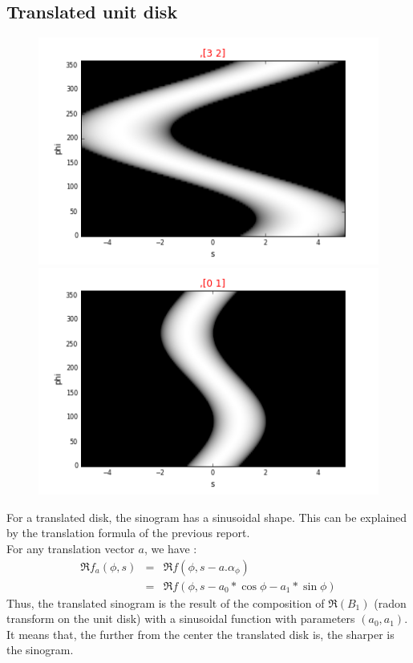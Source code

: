 \documentclass[a4,12pt]{article}
\begin{document}
\subsection{Translated unit disk}
\begin{figure}[h!]
   \begin{minipage}[c]{.46\linewidth}
      \includegraphics[scale=0.5]{../images/sinograms/translatedUnitDisk.png} 
   \end{minipage} \hfill
   \begin{minipage}[c]{.46\linewidth}
      \includegraphics[scale=0.5]{../images/sinograms/translatedUnitDiskCloseCenter1.png} 
   \end{minipage}
\end{figure}
For a translated disk, the sinogram has a sinusoidal shape. This can be explained by the translation formula of the previous report. \\
For any translation vector $a$, we have :
\begin{eqnarray*}
\Re f_{a}(\phi,s) &=& \Re f(\phi,s-a.\alpha_{\phi}) \\
                 &=& \Re f(\phi,s-a_{0}*\cos\phi - a_{1}*\sin\phi)
\end{eqnarray*}
Thus, the translated sinogram is the result of the composition of $\Re(B_{1})$ (radon transform on the unit disk) with a sinusoidal function with parameters $(a_0,a_1)$. It means that, the  further from the center the translated disk is, the sharper is the sinogram. 
\end{document}
